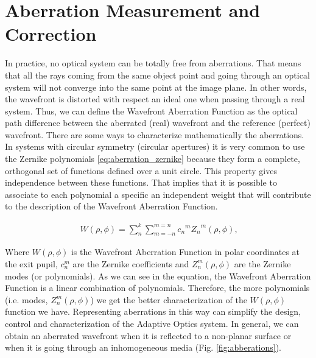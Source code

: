 \section{Aberration Measurement and Correction}
\label{Measurement}

In practice, no optical system can be totally free from aberrations. That means that all the rays coming from the same object point and going through an optical system will not converge into the same point at the image plane. In other words, the wavefront is distorted with respect an ideal one when passing through a real system. Thus, we can define the Wavefront Aberration Function as the optical path difference between the aberrated (real) wavefront and the reference (perfect) wavefront.      
There are some ways to characterize mathematically the aberrations. In systems with circular symmetry (circular apertures) it is very common to use the Zernike polynomials \eqref{eq:aberration_zernike}  because they form a complete, orthogonal set of functions defined over a unit circle. This property gives independence between these functions. That implies that it is possible to associate to each polynomial a specific an independent weight that will contribute to the description of the Wavefront Aberration Function.  

\begin{align}
	\ W(\rho,\phi) = {\sum_{n}^{k}}{\sum_{m=-n}^{m=n}}{{c_n}^m {Z_n}^m}{(\rho,\phi)},
	\label{eq:aberration_zernike}
\end{align}

Where $W(\rho,\phi)$ is the Wavefront Aberration Function in polar coordinates at the exit pupil, $c_n^m$ are the Zernike coefficients and $Z_n^m (\rho,\phi)$ are the Zernike modes (or polynomials). As we can see in the equation, the Wavefront Aberration Function is a linear combination of polynomials. Therefore, the more polynomials (i.e. modes, $Z_n^m (\rho,\phi)$) we get the better characterization of the $W(\rho,\phi)$ function we have.
Representing aberrations in this way can simplify the design, control and characterization of the Adaptive Optics system. 
In general, we can obtain an aberrated wavefront when it is reflected to a non-planar surface or when it is going through an inhomogeneous media (Fig. \ref{fig:abberations}). 

